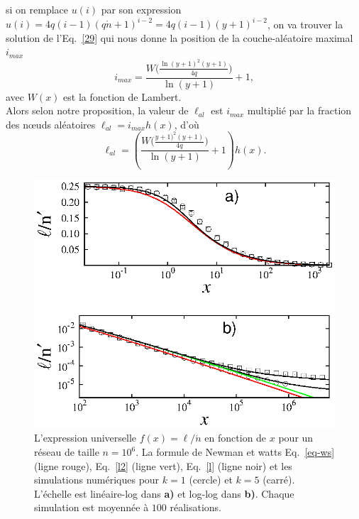 si on remplace $u(i)$ par son expression $u(i)=4q(i-1)(q\acute{n}+1)^{i-2}=4q(i-1)(y+1)^{i-2}$, on va trouver la solution de l'Eq.~\ref{29} qui nous 
donne la position de la couche-aléatoire maximal $i_{max}$ 
\begin{equation}
i_{max}=\frac{W\big(\frac{\ln(y+1)^2(y+1)}{4q}\big)}{\ln(y+1)}+1,
\end{equation}
avec $W(x)$ est la fonction de Lambert.\\
Alors selon notre proposition, la valeur de $\ell_{al}$ est $i_{max}$ multiplié par la fraction des nœuds aléatoires $\ell_{al}=i_{max}h(x)$, d'où 
\begin{equation}
\ell_{al}=(\frac{W\big(\frac{y+1)^2(y+1)}{4q}\big)}{\ln(y+1)}+1)h(x).
\label{lal}
\end{equation}
\begin{figure}[h!]
	\centering
	\includegraphics[scale=1.25,angle=0]{./figures/fig-kpn}
	\caption{L'expression universelle $f(x)=\ell/\acute{n}$ en fonction de $x$ pour un réseau de taille $n=10^6$. La formule de Newman et watts Eq.~\ref{eq-ws} (ligne rouge), Eq.~\ref{l2} (ligne vert), Eq.~\ref{l} (ligne noir) et les simulations numériques pour $k=1$ (cercle) et $k=5$ (carré). L'échelle est linéaire-log dans \textbf{a)} et log-log dans \textbf{b)}. Chaque simulation est moyennée à $100$ réalisations.}
	\label{chemin}
\end{figure}

